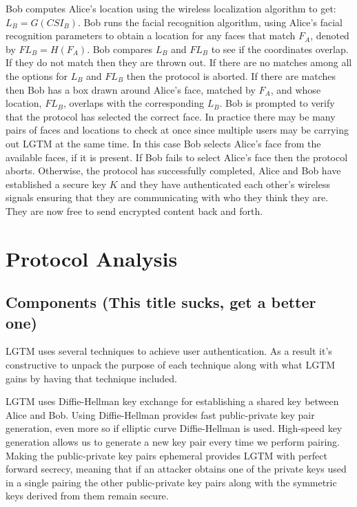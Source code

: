 \documentclass[12pt]{report}
\begin{document}
Bob computes Alice's location using the wireless localization algorithm to get: $L_{B} = G(CSI_{B})$. Bob runs the facial recognition algorithm, using Alice's facial recognition parameters to obtain a location for any faces that match $F_{A}$, denoted by $FL_{B} = H(F_{A})$. Bob compares $L_{B}$ and $FL_{B}$ to see if the coordinates overlap. If they do not match then they are thrown out. If there are no matches among all the options for $L_{B}$ and $FL_{B}$ then the protocol is aborted. If there are matches then Bob has a box drawn around Alice's face, matched by $F_{A}$, and whose location, $FL_{B}$, overlaps with the corresponding $L_{B}$. Bob is prompted to verify that the protocol has selected the correct face. In practice there may be many pairs of faces and locations to check at once since multiple users may be carrying out LGTM at the same time. In this case Bob selects Alice's face from the available faces, if it is present. If Bob fails to select Alice's face then the protocol aborts. Otherwise, the protocol has successfully completed, Alice and Bob have established a secure key $K$ and they have authenticated each other's wireless signals ensuring that they are communicating with who they think they are. They are now free to send encrypted content back and forth. \par


\section{Protocol Analysis}
\subsection{Components (This title sucks, get a better one)}
LGTM uses several techniques to achieve user authentication. As a result it's constructive to unpack the purpose of each technique along with what LGTM gains by having that technique included. \par

LGTM uses Diffie-Hellman key exchange \cite{DiffieHellman2006} for establishing a shared key between Alice and Bob. Using Diffie-Hellman provides fast public-private key pair generation, even more so if elliptic curve Diffie-Hellman is used. High-speed key generation allows us to generate a new key pair every time we perform pairing. Making the public-private key pairs ephemeral provides LGTM with perfect forward secrecy, meaning that if an attacker obtains one of the private keys used in a single pairing the other public-private key pairs along with the symmetric keys derived from them remain secure. \par
\end{document}
